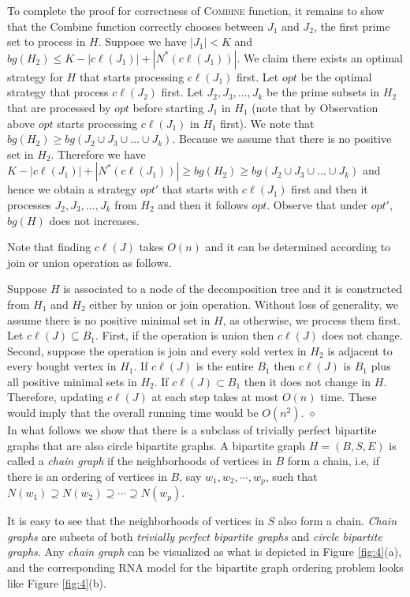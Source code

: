 \documentclass[letterpaper,11pt,abstracton]{scrartcl}
\newcommand{\qed}{\hfill$\diamond$}
\begin{document}
To complete the proof for correctness of \textsc{Combine} function, it remains to show that the Combine function correctly chooses
between $J_1$ and $J_2$, the first prime set to process in $H$. Suppose we have  $|J_1| < K$ and $bg( H_2) \le K- |c\ell(J_1)|+|N^*(c\ell(J_1))|$.
We claim there exists an optimal strategy for $H$ that starts processing $c\ell(J_1)$ first. Let $opt$ be the optimal strategy that process $c\ell(J_2)$ first.
Let $J_2,J_3,\dots,J_k$ be the prime subsets in $H_2$ that are processed by $opt$ before starting $J_1$ in $H_1$ (note that by Observation above
$opt$ starts processing $c\ell(J_1)$ in $H_1$ first). We note that $bg(H_2) \ge bg(J_2 \cup J_3 \cup \dots \cup J_k)$. Because we assume that there is no positive set
in $H_2$. Therefore we have
$K-|c\ell(J_1)|+|N^*(c\ell(J_1))| \ge bg(H_2) \ge bg(J_2 \cup J_3 \cup \dots \cup J_k)$ and hence we obtain a strategy $opt'$ that starts
with $c\ell(J_1)$ first and then it processes $J_2,J_3,\dots,J_k$ from $H_2$ and then it follows $opt$. Observe that under $opt'$, $bg(H)$ does not increases.

Note that finding $c\ell(J)$ takes $O(n)$ and it can be determined according to join or union operation as follows.  
 
Suppose $H$ is associated to a
node of the decomposition tree and it is constructed from $H_1$ and $H_2$ either by union or join operation.
Without loss of generality, we assume there is no positive minimal set in $H$, as otherwise, we process them first.
Let $c\ell(J) \subseteq B_1$. First, if the operation is union then $c\ell(J)$ does not change. Second, suppose the operation is join and every sold vertex in
$H_2$ is adjacent to every bought vertex in $H_1$. If $c\ell(J)$ is the entire $B_1$ then $c\ell(J)$ is $B_1$ plus all positive minimal sets in $H_2$.
If $c\ell(J)\subset B_1$ then it does not change in $H$.
Therefore, updating $c\ell(J)$ at each step takes at most $O(n)$ time. These would imply that the overall running time would be $O(n^2)$. 
\qed \\


In what follows we show that there is a subclass of trivially perfect bipartite graphs that are also circle bipartite graphs.
A bipartite graph $H=(B,S,E)$ is called a \textit{chain graph} if the neighborhoods of vertices in $B$ form a chain, i.e, if there is an ordering of vertices in $B$, say $w_1,w_2,\cdots,w_p$, such that $N(w_1)\supseteq N(w_2)\supseteq \cdots \supseteq N(w_p)$.

It is easy to see that the neighborhoods of
vertices in $S$ also form a chain. \textit{Chain graphs} are subsets of
both \textit{trivially perfect bipartite graphs} and \textit{circle bipartite graphs}.
Any \textit{chain graph} can be visualized as what is
depicted in Figure \ref{fig:4}(a), and the corresponding RNA model for the bipartite graph ordering problem looks like Figure \ref{fig:4}(b).
\end{document}
